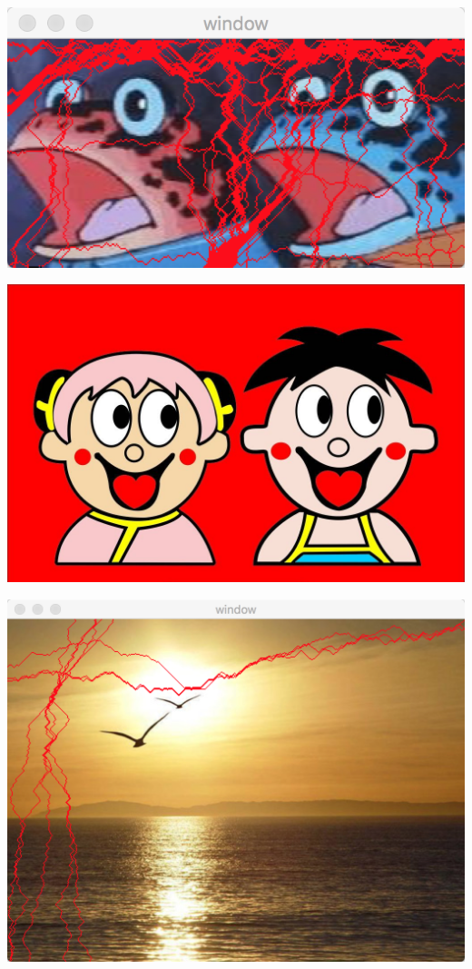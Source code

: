 \documentclass[10pt, a4paper]{article}
\begin{document}
    \includegraphics[scale = .3]{hhhsobelseam.png}

    \includegraphics[scale = .3]{666.bmp}

    \includegraphics[scale = .3]{orisobelseam.png}
\end{document}
